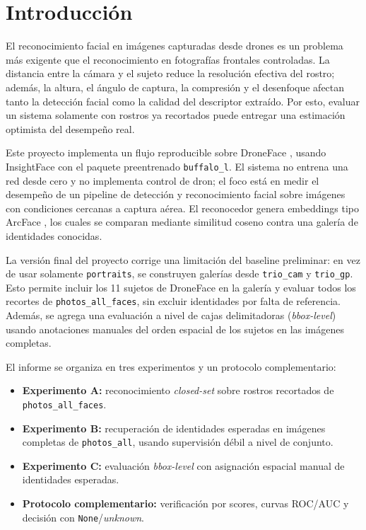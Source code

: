 \documentclass[11pt]{article}
\begin{document}
\section{Introducci\'on}
\label{sec:introduccion}

El reconocimiento facial en im\'agenes capturadas desde drones es un problema m\'as exigente que el reconocimiento en fotograf\'ias frontales controladas. La distancia entre la c\'amara y el sujeto reduce la resoluci\'on efectiva del rostro; adem\'as, la altura, el \'angulo de captura, la compresi\'on y el desenfoque afectan tanto la detecci\'on facial como la calidad del descriptor extra\'ido. Por esto, evaluar un sistema solamente con rostros ya recortados puede entregar una estimaci\'on optimista del desempe\~no real.

Este proyecto implementa un flujo reproducible sobre DroneFace \cite{hsu2017droneface}, usando InsightFace con el paquete preentrenado \texttt{buffalo\_l}. El sistema no entrena una red desde cero y no implementa control de dron; el foco est\'a en medir el desempe\~no de un pipeline de detecci\'on y reconocimiento facial sobre im\'agenes con condiciones cercanas a captura a\'erea. El reconocedor genera embeddings tipo ArcFace \cite{deng2019arcface}, los cuales se comparan mediante similitud coseno contra una galer\'ia de identidades conocidas.

La versi\'on final del proyecto corrige una limitaci\'on del baseline preliminar: en vez de usar solamente \texttt{portraits}, se construyen galer\'ias desde \texttt{trio\_cam} y \texttt{trio\_gp}. Esto permite incluir los 11 sujetos de DroneFace en la galer\'ia y evaluar todos los recortes de \texttt{photos\_all\_faces}, sin excluir identidades por falta de referencia. Adem\'as, se agrega una evaluaci\'on a nivel de cajas delimitadoras (\textit{bbox-level}) usando anotaciones manuales del orden espacial de los sujetos en las im\'agenes completas.

El informe se organiza en tres experimentos y un protocolo complementario:

\begin{itemize}
    \item \textbf{Experimento A:} reconocimiento \textit{closed-set} sobre rostros recortados de \texttt{photos\_all\_\allowbreak faces}.
    \item \textbf{Experimento B:} recuperaci\'on de identidades esperadas en im\'agenes completas de \texttt{photos\_all}, usando supervisi\'on d\'ebil a nivel de conjunto.
    \item \textbf{Experimento C:} evaluaci\'on \textit{bbox-level} con asignaci\'on espacial manual de identidades esperadas.
    \item \textbf{Protocolo complementario:} verificaci\'on por scores, curvas ROC/AUC y decisi\'on con \texttt{None}/\textit{unknown}.
\end{itemize}
\end{document}
